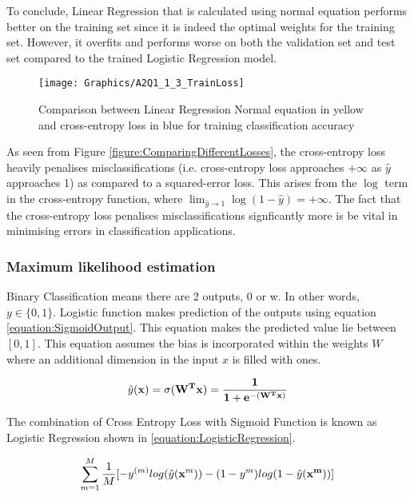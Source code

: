 \documentclass[a4paper,12pt]{article}
\begin{document}
To conclude, Linear Regression that is calculated using normal equation performs better on the training set since it is indeed the optimal weights for the training set. However, it overfits and performs worse on both the validation set and test set compared to the trained Logistic Regression model. 
 
\begin{figure}[!htb]
\centering
\texttt{[image: Graphics/A2Q1\_1\_3\_TrainLoss]}
\caption{\label{figure:A2Q1_1_3_TrainLoss} Comparison between Linear Regression Normal equation in yellow and cross-entropy loss in blue for training classification accuracy}
\end{figure}

As seen from Figure \ref{figure:ComparingDifferentLosses}, the cross-entropy loss heavily penalises misclassifications (i.e. cross-entropy loss approaches $+ \infty$ as $\hat{y}$ approaches 1) as compared to a squared-error loss. This arises from the $\log$ term in the cross-entropy function, where $\lim_{\hat{y} \rightarrow 1} \log(1 - \hat{y}) = + \infty$. The fact that the cross-entropy loss penalises misclassifications signficantly more is be vital in minimising errors in classification applications.

\clearpage
\subsubsection{Maximum likelihood estimation}
Binary Classification means there are 2 outputs, 0 or w. In other words, $y \in \{0,1\}$. 
Logistic function  makes prediction of the outputs using equation \ref{equation:SigmoidOutput}. This equation makes the predicted value lie between $[0,1]$. 
This equation assumes the bias is incorporated within the weights $W$ where an additional dimension in the input $x$ is filled with ones. 

\begin{equation}
\label{equation:SigmoidOutput}
\hat{y}(\bf{x}) = \sigma(W^{T}\mathbf{x}) = \frac{1}{1+e^{-(W^{T}\mathbf{x})}}
\end{equation}


The combination of Cross Entropy Loss with Sigmoid Function is known as Logistic Regression shown in \ref{equation:LogisticRegression}. 

\begin{equation}
\label{equation:LogisticRegression}
\sum_{m=1}^{M}\frac{1}{M}[-y^{(m)}log(\hat{y}(\mathbf{x}^{m})) - (1-y^{m})log(1-\hat{y}(\bf{x}^{m}))]
\end{equation}
\end{document}
